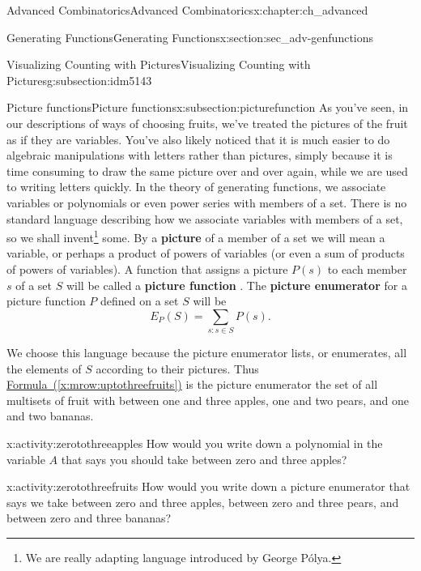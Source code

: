 \documentclass[oneside,10pt,]{book}
\newcommand{\terminology}[1]{\textbf{#1}}
\numberwithin{equation}{chapter}
\begin{document}
\begin{chapterptx}{Advanced Combinatorics}{}{Advanced Combinatorics}{}{}{x:chapter:ch_advanced}
\begin{sectionptx}{Generating Functions}{}{Generating Functions}{}{}{x:section:sec_adv-genfunctions}
\begin{subsectionptx}{Visualizing Counting with Pictures}{}{Visualizing Counting with Pictures}{}{}{g:subsection:idm5143}
\end{subsectionptx}
%
%
\typeout{************************************************}
\typeout{************************************************}
%
\begin{subsectionptx}{Picture functions}{}{Picture functions}{}{}{x:subsection:picturefunction}
As you've seen, in our descriptions of ways of choosing fruits, we've treated the pictures of the fruit as if they are variables. You've also likely noticed that it is much easier to do algebraic manipulations with letters rather than pictures, simply because it is time consuming to draw the same picture over and over again, while we are used to writing letters quickly. In the theory of generating functions, we associate variables or polynomials or even power series with members of a set. There is no standard language describing how we associate variables with members of a set, so we shall invent\footnote{We are really adapting language introduced by George Pólya.\label{g:fn:idm5214}} some. By a \terminology{picture} of a member of a set we will mean a variable, or perhaps a product of powers of variables (or even a sum of products of powers of variables). A function that assigns a picture \(P(s)\) to each member \(s\) of a set \(S\) will be called a \terminology{picture function} . The \terminology{picture enumerator} for a picture function \(P\) defined on a set \(S\) will be%
\begin{equation*}
E_P(S) = \sum_{s: s\in S}  P(s).
\end{equation*}
%
\par
We choose this language because the picture enumerator lists, or enumerates, all the elements of \(S\) according to their pictures. Thus \hyperref[x:mrow:uptothreefruits]{Formula~(\ref{x:mrow:uptothreefruits})} is the picture enumerator the set of all multisets of fruit with between one and three apples, one and two pears, and one and two bananas.%
\begin{activity}{}{x:activity:zerotothreeapples}%
How would you write down a polynomial in the variable \(A\) that says you should take between zero and three apples?%
\end{activity}
\begin{activity}{}{x:activity:zerotothreefruits}%
How would you write down a picture enumerator that says we take between zero and three apples, between zero and three pears, and between zero and three bananas?%
\end{activity}

\end{subsectionptx}
\end{sectionptx}
\end{chapterptx}
\end{document}
